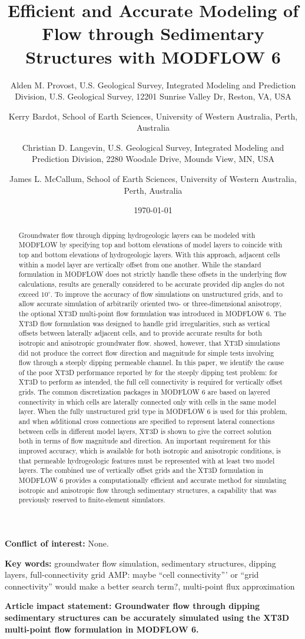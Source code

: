 \documentclass{article}
\title{Efficient and Accurate Modeling of Flow through Sedimentary Structures with MODFLOW 6}
\author{
	Alden M. Provost, U.S. Geological Survey, Integrated Modeling and Prediction Division, U.S. Geological Survey, 12201 Sunrise Valley Dr, Reston, VA, USA  \\
	\and 
	Kerry Bardot, School of Earth Sciences, University of Western Australia, Perth, Australia \\
	\and 
	Christian D. Langevin, U.S. Geological Survey, Integrated Modeling and Prediction Division, 2280 Woodale Drive, Mounds View, MN, USA \\
	\and 
	James L. McCallum, School of Earth Sciences, University of Western Australia, Perth, Australia \\
	}
\date{\today}
\begin{document}
\maketitle

\textbf{Conflict of interest:} None.

\textbf{Key words:} groundwater flow simulation, sedimentary structures, dipping layers, full-connectivity grid {\color{red} AMP: maybe ``cell connectivity''' or ``grid connectivity'' would make a better search term?}, multi-point flux approximation

\textbf{Article impact statement: Groundwater flow through dipping sedimentary structures can be accurately simulated using the XT3D multi-point flow formulation in MODFLOW 6.}

\begin{abstract}
Groundwater flow through dipping hydrogeologic layers can be modeled with MODFLOW by specifying top and bottom elevations of model layers to coincide with top and bottom elevations of hydrogeologic layers.  With this approach, adjacent cells within a model layer are vertically offset from one another.  While the standard formulation in MODFLOW does not strictly handle these offsets in the underlying flow calculations, results are generally considered to be accurate provided dip angles do not exceed $10^{\circ}$.  To improve the accuracy of flow simulations on unstructured grids, and to allow accurate simulation of arbitrarily oriented two- or three-dimensional anisotropy, the optional XT3D multi-point flow formulation was introduced in MODFLOW 6.  The XT3D flow formulation was designed to handle grid irregularities, such as vertical offsets between laterally adjacent cells, and to provide accurate results for both isotropic and anisotropic groundwater flow.  \cite{bardot2022} showed, however, that XT3D simulations did not produce the correct flow direction and magnitude for simple tests involving flow through a steeply dipping permeable channel.  In this paper, we identify the cause of the poor XT3D performance reported by \cite{bardot2022} for the steeply dipping test problem: for XT3D to perform as intended, the full cell connectivity is required for vertically offset grids.  The common discretization packages in MODFLOW 6 are based on layered connectivity in which cells are laterally connected only with cells in the same model layer.   When the fully unstructured grid type in MODFLOW 6 is used for this problem, and when additional cross connections are specified to represent lateral connections between cells in different model layers, XT3D is shown to give the correct solution both in terms of flow magnitude and direction.  An important requirement for this improved accuracy, which is available for both isotropic and anisotropic conditions, is that permeable hydrogeologic features must be represented with at least two model layers.  The combined use of vertically offset grids and the XT3D formulation in MODFLOW 6 provides a computationally efficient and accurate method for simulating isotropic and anisotropic flow through sedimentary structures, a capability that was previously reserved to finite-element simulators.
\end{abstract}
\end{document}

